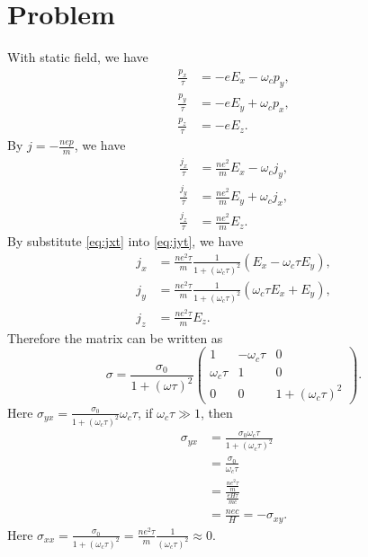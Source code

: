 \documentclass[12pt]{article}
\newcommand*{\RMN}[1]{\uppercase\expandafter{\romannumeral#1}}
\begin{document}
\section*{Problem \RMN{5}}
With static field, we have
\begin{align}
	\frac{p_x}{\tau} & = -e E_x - \omega_c p_y, \\
	\frac{p_y}{\tau} & = -e E_y + \omega_c p_x, \\
	\frac{p_z}{\tau} & = -e E_z.
\end{align}
By $j=-\frac{nep}{m}$, we have
\begin{align}
	\frac{j_x}{\tau} & = \frac{ne^2}{m}E_x - \omega_c j_y,\label{eq:jxt} \\
	\frac{j_y}{\tau} & = \frac{ne^2}{m}E_y + \omega_c j_x,\label{eq:jyt} \\
	\frac{j_z}{\tau} & = \frac{ne^2}{m}E_z.
\end{align}
By substitute \eqref{eq:jxt} into \eqref{eq:jyt}, we have
\begin{align}
	j_x & = \frac{ne^2\tau}{m}\frac{1}{1+(\omega_c\tau)^2}(E_x - \omega_c\tau E_y), \\
	j_y & =\frac{ne^2\tau}{m}\frac{1}{1+(\omega_c\tau)^2}(\omega_c\tau E_x + E_y),  \\
	j_z & = \frac{ne^2\tau}{m}E_z.
\end{align}
Therefore the matrix can be written as
\begin{equation}
	\sigma = \frac{\sigma_0}{1+(\omega\tau)^2}
	\begin{pmatrix}
		1            & -\omega_c\tau & 0                  \\
		\omega_c\tau & 1             & 0                  \\
		0            & 0             & 1+(\omega_c\tau)^2
	\end{pmatrix}.
\end{equation}
Here $\sigma_{yx}=\frac{\sigma_0}{1+(\omega_c\tau)^2}\omega_c\tau$, if $\omega_c\tau\gg1$, then
\begin{equation}
	\begin{split}
		\sigma_{yx} &= \frac{\sigma_0\omega_c\tau}{1+(\omega_c\tau)^2}\\
		&= \frac{\sigma_0}{\omega_c\tau}\\
		&= \frac{\frac{ne^2\tau}{m}}{\frac{eH\tau}{mc}}\\
		&= \frac{nec}{H} = -\sigma_{xy}.
	\end{split}
\end{equation}
Here $\sigma_{xx} = \frac{\sigma_0}{1+(\omega_c\tau)^2} = \frac{ne^2\tau}{m}\frac{1}{(\omega_c\tau)^2} \approx 0$.
\end{document}
